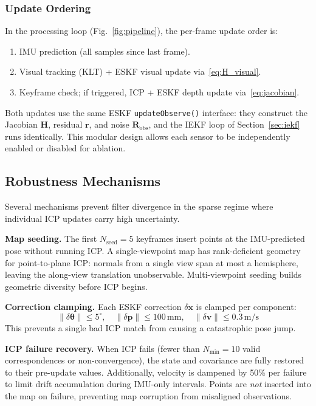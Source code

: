 \subsubsection{Update Ordering}

In the processing loop (Fig.~\ref{fig:pipeline}), the per-frame update order is:
\begin{enumerate}
    \item IMU prediction (all samples since last frame).
    \item Visual tracking (KLT) + ESKF visual update via~\eqref{eq:H_visual}.
    \item Keyframe check; if triggered, ICP + ESKF depth update via~\eqref{eq:jacobian}.
\end{enumerate}
Both updates use the same ESKF \texttt{updateObserve()} interface: they construct the Jacobian $\mathbf{H}$, residual $\mathbf{r}$, and noise $\mathbf{R}_\text{obs}$, and the IEKF loop of Section~\ref{sec:iekf} runs identically.
This modular design allows each sensor to be independently enabled or disabled for ablation.

\subsection{Robustness Mechanisms}
\label{sec:robustness}

Several mechanisms prevent filter divergence in the sparse regime where individual ICP updates carry high uncertainty.

\textbf{Map seeding.}
The first $N_\text{seed} = 5$ keyframes insert points at the IMU-predicted pose without running ICP.
A single-viewpoint map has rank-deficient geometry for point-to-plane ICP: normals from a single view span at most a hemisphere, leaving the along-view translation unobservable.
Multi-viewpoint seeding builds geometric diversity before ICP begins.

\textbf{Correction clamping.}
Each ESKF correction $\delta\mathbf{x}$ is clamped per component:
\begin{equation}
    \|\delta\boldsymbol{\theta}\| \leq 5^\circ, \quad
    \|\delta\mathbf{p}\| \leq 100\,\text{mm}, \quad
    \|\delta\mathbf{v}\| \leq 0.3\,\text{m/s}
    \label{eq:clamping}
\end{equation}
This prevents a single bad ICP match from causing a catastrophic pose jump.

\textbf{ICP failure recovery.}
When ICP fails (fewer than $N_\text{min} = 10$ valid correspondences or non-convergence), the state and covariance are fully restored to their pre-update values.
Additionally, velocity is dampened by 50\% per failure to limit drift accumulation during IMU-only intervals.
Points are \emph{not} inserted into the map on failure, preventing map corruption from misaligned observations.

